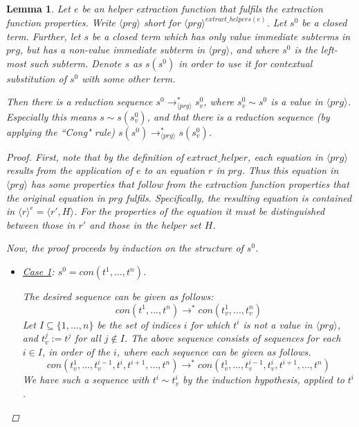 \documentclass[11pt]{article} %
\newtheorem{lemma}{Lemma}
\begin{document}
\begin{lemma}

Let $e$ be an helper extraction function that fulfils the extraction function properties. Write $\langle prg \rangle$ short for $\langle prg \rangle^{extract\_helpers(e)}$. Let $s^0$ be a closed term. Further, let $s$ be a closed term which has only value immediate subterms in $prg$, but has a non-value immediate subterm in $\langle prg \rangle$, and where $s^0$ is the left-most such subterm. Denote $s$ as $s(s^0)$ in order to use it for contextual substitution of $s^0$ with some other term.

Then there is a reduction sequence $s^0 \longrightarrow^*_{\langle prg \rangle} s^0_v$, where $s^0_v \sim s^0$ is a value in $\langle prg \rangle$. Especially this means $s \sim s(s^0_v)$, and that there is a reduction sequence (by applying the ``Cong" rule) $s(s^0) \longrightarrow^*_{\langle prg \rangle} s(s^0_v)$.

\begin{proof}

First, note that by the definition of $extract\_helper$, each equation in $\langle prg \rangle$ results from the application of $e$ to an equation $r$ in $prg$. Thus this equation in $\langle prg \rangle$ has some properties that follow from the extraction function properties that the original equation in $prg$ fulfils. Specifically, the resulting equation is contained in $\langle r \rangle^e = \big\langle r', H \big\rangle$. For the properties of the equation it must be distinguished between those in $r'$ and those in the helper set $H$.

Now, the proof proceeds by induction on the structure of $s^0$.

\begin{itemize}

\item \underline{Case 1}: $s^0 = con(t^1, ..., t^n)$.

The desired sequence can be given as follows:
\begin{equation*}
con(t^1, ..., t^n) \longrightarrow^* con(t^1_v, ..., t^n_v)
\end{equation*}
Let $I \subseteq \{1, ..., n\}$ be the set of indices $i$ for which $t^i$ is not a value in $\langle prg \rangle$, and $t^j_v := t^j$ for all $j \not\in I$. The above sequence consists of sequences for each $i \in I$, in order of the $i$, where each sequence can be given as follows.
\begin{equation*}
con(t^1_v, ..., t^{i-1}_v, t^i, t^{i+1}, ..., t^n) \longrightarrow^* con(t^1_v, ..., t^{i-1}_v, t^i_v, t^{i+1}, ..., t^n)
\end{equation*}
We have such a sequence with $t^i \sim t^i_v$ by the induction hypothesis, applied to $t^i$.


\end{itemize}
\end{proof}
\end{lemma}
\end{document}
